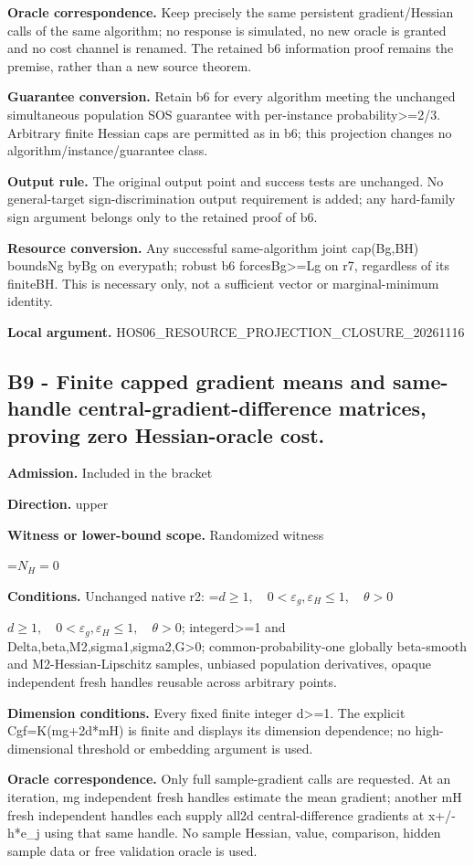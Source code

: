 \documentclass[10pt,a4paper]{article}
\newcommand{\AtlasMath}[1]{\par\begingroup\centering\setbox0=\hbox{$\displaystyle #1$}\ifdim\wd0>1.4\linewidth\typeout{ATLAS WIDE FORMULA: \the\wd0}\fi\ifdim\wd0>\linewidth\resizebox{\linewidth}{!}{\box0}\else\box0\fi\par\endgroup}
\newcommand{\AtlasInlineMath}[1]{\begingroup\setbox0=\hbox{$#1$}\ifdim\wd0>.4\linewidth\endgroup\AtlasMath{#1}\else\endgroup$#1$\fi}
\begin{document}
\textbf{Oracle correspondence.} Keep precisely the same persistent gradient/Hessian calls of the same algorithm; no response is simulated, no new oracle is granted and no cost channel is renamed. The retained b6 information proof remains the premise, rather than a new source theorem.

\textbf{Guarantee conversion.} Retain b6 for every algorithm meeting the unchanged simultaneous population SOS guarantee with per-instance probability>=2/3. Arbitrary finite Hessian caps are permitted as in b6; this projection changes no algorithm/instance/guarantee class.

\textbf{Output rule.} The original output point and success tests are unchanged. No general-target sign-discrimination output requirement is added; any hard-family sign argument belongs only to the retained proof of b6.

\textbf{Resource conversion.} Any successful same-algorithm joint cap(Bg,BH) boundsNg byBg on everypath; robust b6 forcesBg>=Lg on r7, regardless of its finiteBH. This is necessary only, not a sufficient vector or marginal-minimum identity.

\textbf{Local argument.} HOS06\_\allowbreak{}RESOURCE\_\allowbreak{}PROJECTION\_\allowbreak{}CLOSURE\_\allowbreak{}20261116

\subsection{B9 - Finite capped gradient means and same-handle central-gradient-difference matrices, proving zero Hessian-oracle cost.}
\textbf{Admission.} Included in the bracket

\textbf{Direction.} upper

\textbf{Witness or lower-bound scope.} Randomized witness

\AtlasMath{N_H=0}
\textbf{Conditions.} Unchanged native r2: \AtlasInlineMath{d\ge1,\quad0<\varepsilon_g,\varepsilon_H\le1,\quad\theta>0}; integerd>=1 and Delta,beta,M2,sigma1,sigma2,G>0; common-probability-one globally beta-smooth and M2-Hessian-Lipschitz samples, unbiased population derivatives, opaque independent fresh handles reusable across arbitrary points.

\textbf{Dimension conditions.} Every fixed finite integer d>=1. The explicit Cgf=K(mg+2d*mH) is finite and displays its dimension dependence; no high-dimensional threshold or embedding argument is used.

\textbf{Oracle correspondence.} Only full sample-gradient calls are requested. At an iteration, mg independent fresh handles estimate the mean gradient; another mH fresh independent handles each supply all2d central-difference gradients at x+/-h*e\_\allowbreak{}j using that same handle. No sample Hessian, value, comparison, hidden sample data or free validation oracle is used.
\end{document}
